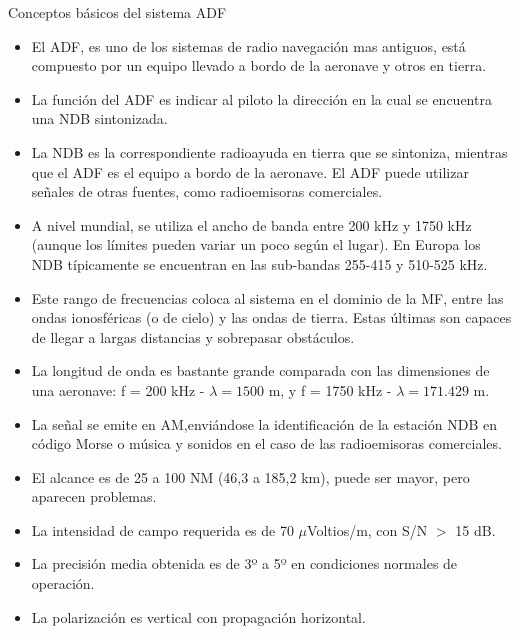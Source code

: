 %
\begin{tcolorbox}{Conceptos b\'asicos del sistema \ac{ADF}}

  \begin{itemize}
  \item El \ac{ADF}, es uno de los sistemas de radio navegación mas
    antiguos, est\'a compuesto por un equipo llevado a bordo de la
    aeronave y otros en tierra.

  \item La funci\'on del ADF es indicar al piloto la direcci\'on en la
    cual se encuentra una \ac{NDB} sintonizada.

  \item La \ac{NDB} es la correspondiente radioayuda en tierra que se
    sintoniza, mientras que el ADF es el equipo a bordo de la
    aeronave. El ADF puede utilizar se\~nales de otras fuentes, como
    radioemisoras comerciales.

  \item A nivel mundial, se utiliza el ancho de banda entre 200 kHz y
    1750 kHz (aunque los l\'imites pueden variar un poco seg\'un el
    lugar). En Europa los NDB t\'ipicamente se encuentran en las
    sub-bandas 255-415 y 510-525 kHz.

  \item Este rango de frecuencias coloca al sistema en el dominio de la
    \ac{MF}, entre las  ondas ionosf\'ericas (o de
    cielo) y las ondas de tierra. Estas \'ultimas son capaces de llegar a
    largas distancias y sobrepasar obst\'aculos.

  \item La longitud de onda es bastante grande
    comparada con las dimensiones de una aeronave: f = 200 kHz -
    $\lambda = 1500$ m, y f = 1750 kHz - $\lambda = 171.429$ m.

  \item La se\~nal se emite en \ac{AM},envi\'andose la
    identificaci\'on de la estaci\'on NDB en c\'odigo Morse
    o m\'usica y sonidos en el caso de las radioemisoras comerciales.

  \item El alcance es de 25 a 100 NM (46,3 a 185,2 km), puede ser
    mayor, pero aparecen problemas.

  \item La intensidad de campo requerida es de 70 $\mu$Voltios/m, con
    S/N $>$ 15 dB.

  \item La precisi\'on media obtenida es de 3º a 5º en condiciones
    normales de operaci\'on.

  \item La polarizaci\'on es vertical con propagaci\'on horizontal.
  \end{itemize}

\end{tcolorbox}

